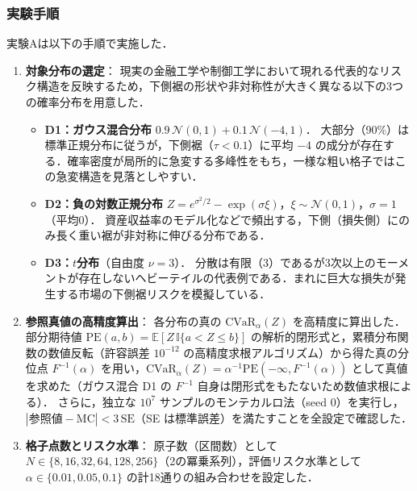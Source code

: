 \documentclass[a4paper,10pt]{jsarticle}
\theoremstyle{definition}
\newcommand{\CVaR}{\mathrm{CVaR}}
\renewcommand{\Finv}{F^{-1}}
\newcommand{\E}{\mathbb{E}}
\begin{document}
\subsubsection{実験手順}
実験Aは以下の手順で実施した．

\begin{enumerate}
  \item \textbf{対象分布の選定}：
  現実の金融工学や制御工学において現れる代表的なリスク構造を反映するため，下側裾の形状や非対称性が大きく異なる以下の3つの確率分布を用意した．
  \begin{itemize}
    \item \textbf{D1：ガウス混合分布} $0.9\,\mathcal N(0,1) + 0.1\,\mathcal N(-4,1)$．
    大部分（90\%）は標準正規分布に従うが，下側裾（$\tau < 0.1$）に平均 $-4$ の成分が存在する．確率密度が局所的に急変する多峰性をもち，一様な粗い格子ではこの急変構造を見落としやすい．
    \item \textbf{D2：負の対数正規分布} $Z = e^{\sigma^2/2} - \exp(\sigma\xi)$，$\xi \sim \mathcal N(0,1)$，$\sigma=1$（平均0）．
    資産収益率のモデル化などで頻出する，下側（損失側）にのみ長く重い裾が非対称に伸びる分布である．
    \item \textbf{D3：$t$分布}（自由度 $\nu=3$）．
    分散は有限（3）であるが3次以上のモーメントが存在しないヘビーテイルの代表例である．まれに巨大な損失が発生する市場の下側裾リスクを模擬している．
  \end{itemize}

  \item \textbf{参照真値の高精度算出}：
  各分布の真の $\CVaR_\alpha(Z)$ を高精度に算出した．部分期待値 $\mathrm{PE}(a,b) = \E[Z\,\mathbb{I}\{a < Z \le b\}]$ の解析的閉形式と，累積分布関数の数値反転（許容誤差 $10^{-12}$ の高精度求根アルゴリズム）から得た真の分位点 $\Finv(\alpha)$ を用い，$\CVaR_\alpha(Z) = \alpha^{-1}\mathrm{PE}(-\infty, \Finv(\alpha))$ として真値を求めた（ガウス混合 D1 の $\Finv$ 自身は閉形式をもたないため数値求根による）．
  さらに，独立な $10^7$ サンプルのモンテカルロ法（seed 0）を実行し，$|\text{参照値} - \text{MC}| < 3\,\mathrm{SE}$（SE は標準誤差）を満たすことを全設定で確認した．

  \item \textbf{格子点数とリスク水準}：
  原子数（区間数）として $N \in \{8, 16, 32, 64, 128, 256\}$（2の冪乗系列），評価リスク水準として $\alpha \in \{0.01, 0.05, 0.1\}$ の計18通りの組み合わせを設定した．


\end{enumerate}
\end{document}
